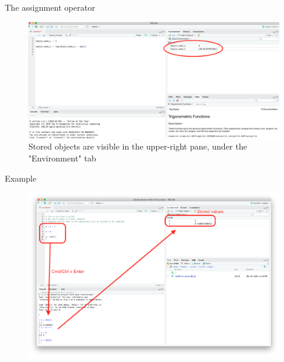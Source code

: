 \documentclass[ignorenonframetext,]{beamer}
\begin{document}
\begin{frame}{The assignment operator}
\protect\hypertarget{the-assignment-operator-1}{}

\begin{figure}
\includegraphics[scale=.19]{figures/objects.png}
\caption{Stored objects are visible in the upper-right pane, under the "Environment" tab}
\end{figure}

\end{frame}

\begin{frame}{Example}
\protect\hypertarget{example}{}

\begin{figure}
\includegraphics[scale=0.17]{figures/edit-script.png}
\end{figure}

\end{frame}
\end{document}
